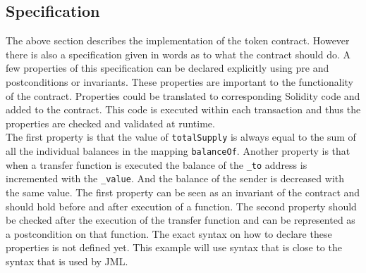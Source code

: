 \documentclass[a4paper]{article}
\begin{document}


\subsection{Specification}
The above section describes the implementation of the token contract. However there is also a specification given in words as to what the contract should do. A few properties of this specification can be declared explicitly using pre and postconditions or invariants. These properties are important to the functionality of the contract. Properties could be translated to corresponding Solidity code and added to the contract. This code is executed within each transaction and thus the properties are checked and validated at runtime. \\
The first property is that the value of \texttt{totalSupply} is always equal to the sum of all the individual balances in the mapping \texttt{balanceOf}. Another property is that when a transfer function is executed the balance of the \texttt{\_to} address is incremented with the \texttt{\_value}. And the balance of the sender is decreased with the same value. The first property can be seen as an invariant of the contract and should hold before and after execution of a function. The second property should be checked after the execution of the transfer function and can be represented as a postcondition on that function. The exact syntax on how to declare these properties is not defined yet. This example will use syntax that is close to the syntax that is used by JML.


 
\end{document}
